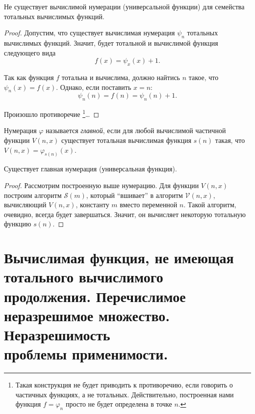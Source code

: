 \documentclass{article}
\begin{document}
    \begin{theorem}
        Не существует вычислимой нумерации (универсальной функции) для семейства тотальных
        вычислимых функций.
    \end{theorem}
    \begin{proof}
        Допустим, что существует вычислимая нумерация \(\psi_n\) тотальных вычислимых функций. Значит,
        будет тотальной и вычислимой функция следующего вида
        \[
            f(x) = \psi_x(x) + 1.
        \]

        Так как функция \(f\) тотальна и вычислима, должно найтись \(n\) такое, что \(\psi_n(x) = f(x)\).
        Однако, если поставить \(x = n\):
        \[
            \psi_n(n) = f(n) = \psi_n(n) + 1.
        \]

        Произошло противоречие \footnote{Такая конструкция не будет приводить к противоречию,
        если говорить о частичных функциях, а не тотальных. Действительно, построенная нами
        функция \(f = \varphi_n\) просто не будет определена в точке \(n\).}\dots

    \end{proof}

    \begin{definition}
        Нумерация \(\varphi\) называется \textit{главной}, если для любой вычислимой частичной
        функции \(V(n, x)\) существует тотальная вычислимая функция \(s(n)\) такая, что \(V(n, x)
        = \varphi_{s(n)}(x)\).
    \end{definition}

    \begin{theorem}
        Существует главная нумерация (универсальная функция).
    \end{theorem}

    \begin{proof}
        Рассмотрим построенную выше нумерацию. Для функции \(V(n, x)\) построим алгоритм \(\mathcal{S}(m)\),
        который ``вшивает'' в алгоритм \(\mathcal{V}(n, x)\), вычисляющий \(V(n, x)\), константу \(m\) вместо
        переменной \(n\). Такой алгоритм, очевидно, всегда будет завершаться. Значит, он вычисляет
        некоторую тотальную функцию \(s(n)\).
    \end{proof}

    \section{Вычислимая функция, не имеющая тотального вычислимого продолжения. Перечислимое неразрешимое
    множество. Неразрешимость \\ проблемы применимости.}
\end{document}
